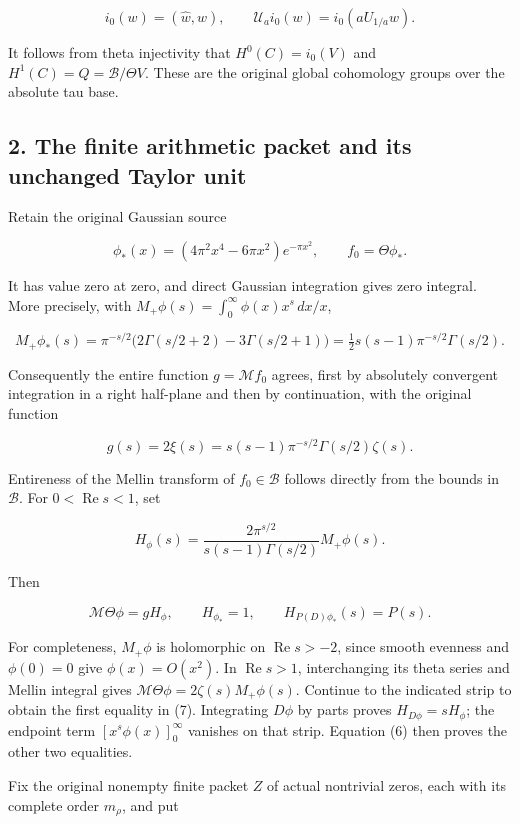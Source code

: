 \documentclass[10pt,a4paper,oneside]{report}
\begin{document}
\[i_0(w)=(\widehat w,w),\qquad
\mathcal U_ai_0(w)=i_0(aU_{1/a}w).\tag{5}\]

It follows from theta injectivity that \(H^0(C)=i_0(V)\) and
\(H^1(C)=Q=\mathscr B/\Theta V\). These are the original global
cohomology groups over the absolute tau base.

\subsection{2. The finite arithmetic packet and its unchanged Taylor
unit}\label{proof04:the-finite-arithmetic-packet-and-its-unchanged-taylor-unit}

Retain the original Gaussian source

\[\phi_*(x)=(4\pi^2x^4-6\pi x^2)e^{-\pi x^2},\qquad f_0=\Theta\phi_*.\]

It has value zero at zero, and direct Gaussian integration gives zero
integral. More precisely, with
\(M_+\phi(s)=\int_0^\infty\phi(x)x^s\,dx/x\),

\[
M_+\phi_*(s)=\pi^{-s/2}\bigl(2\Gamma(s/2+2)-3\Gamma(s/2+1)\bigr)
=\tfrac12s(s-1)\pi^{-s/2}\Gamma(s/2).\tag{6}
\]

Consequently the entire function \(g=\mathcal Mf_0\) agrees, first by
absolutely convergent integration in a right half-plane and then by
continuation, with the original function

\[g(s)=2\xi(s)=s(s-1)\pi^{-s/2}\Gamma(s/2)\zeta(s).\]

Entireness of the Mellin transform of \(f_0\in\mathscr B\) follows
directly from the bounds in \(\mathscr B\). For
\(0<\operatorname{Re}s<1\), set

\[H_\phi(s)=\frac{2\pi^{s/2}}{s(s-1)\Gamma(s/2)}M_+\phi(s).\]

Then

\[\mathcal M\Theta\phi=gH_\phi,\qquad H_{\phi_*}=1,\qquad
H_{P(D)\phi_*}(s)=P(s).\tag{7}\]

For completeness, \(M_+\phi\) is holomorphic on
\(\operatorname{Re}s>-2\), since smooth evenness and \(\phi(0)=0\) give
\(\phi(x)=O(x^2)\). In \(\operatorname{Re}s>1\), interchanging its theta
series and Mellin integral gives
\(\mathcal M\Theta\phi=2\zeta(s)M_+\phi(s)\). Continue to the indicated
strip to obtain the first equality in (7). Integrating \(D\phi\) by
parts proves \(H_{D\phi}=sH_\phi\); the endpoint term
\([x^s\phi(x)]_0^\infty\) vanishes on that strip. Equation (6) then
proves the other two equalities.

Fix the original nonempty finite packet \(Z\) of actual nontrivial
zeros, each with its complete order \(m_\rho\), and put
\end{document}

